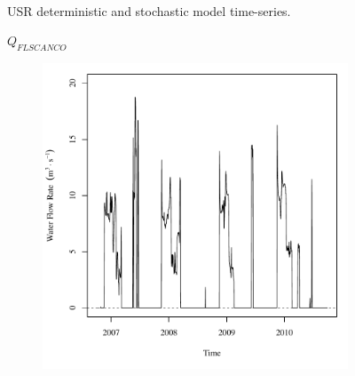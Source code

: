 \begin{linenumbers}
\begin{landscape}
\begin{figure}
\begin{subfigure}{0.7\textwidth}
		\end{subfigure}\\
		\caption{USR deterministic and stochastic model time-series.}
	\end{figure}
\end{landscape}
\subfiguremid
\begin{landscape}
	\begin{figure}
		\centering
		$ Q_{FLSCANCO} $
		\begin{subfigure}{0.7\textwidth}
			\centering
			\includegraphics[width=\textwidth]{"Figures/Results_USR/Deterministic/Q FLS"}
		\end{subfigure}%
		\begin{subfigure}{0.7\textwidth}
			\centering

\end{subfigure}
\end{figure}
\end{landscape}
\end{linenumbers}
